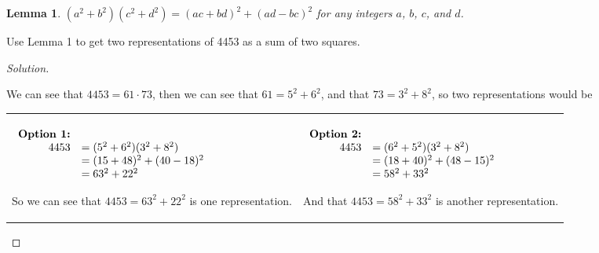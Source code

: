 \documentclass[11pt]{article}
\newtheorem{lemma}[theorem]{Lemma}
\newenvironment{problem}[2][Problem]{\begin{trivlist}
\item[\hskip \labelsep {\bfseries #1}\hskip \labelsep {\bfseries #2.}]}{\end{trivlist}}
\newenvironment{solution}
  {\renewcommand\qedsymbol{$~$}\begin{proof}[Solution]$ $\par\nobreak\ignorespaces}
  {\end{proof}}
\begin{document}
\begin{lemma}
  $(a^2+b^2)(c^2+d^2)=(ac+bd)^2+(ad-bc)^2$ for any integers $a$, $b$, $c$, and $d$.
\end{lemma}

\begin{problem}{4}
Use Lemma 1 to get two representations of 4453 as a sum of two squares.
\end{problem}

\begin{solution}
  We can see that $4453= 61\cdot 73$, then we can see that $61=5^2+6^2$, and that $73=3^2+8^2$, so two representations would be
  \begin{center}
    \begin{NiceTabular}[width=0.95\textwidth]{X[l] !{\qquad} X[l]}
      \begin{math}
        \begin{array}[t]{rl}
          \textbf{Option 1:} &                       \\
          4453               & = (5^2+6^2)(3^2+8^2)  \\
                             & = (15+48)^2+(40-18)^2 \\
                             & = 63^2 + 22^2         \\
        \end{array}
      \end{math}

      So we can see that $4453=63^2 + 22^2$ is one representation.



       &
      \begin{math}
        \begin{array}[t]{rl}
          \textbf{Option 2:} &                       \\
          4453               & = (6^2+5^2)(3^2+8^2)  \\
                             & = (18+40)^2+(48-15)^2 \\
                             & = 58^2 + 33^2         \\
        \end{array}
      \end{math}

      And that $4453=58^2+33^2$ is another representation.
      \\
    \end{NiceTabular}
  \end{center}
\end{solution}
\end{document}
